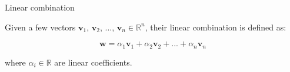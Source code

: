 \documentclass{beamer}
\begin{document}
\begin{frame}{Linear combination}
	\begin{flushleft}
		
	Given a few vectors $\mathbf v_1$, $\mathbf v_2$, ..., $\mathbf v_n \in \mathbb{R}^n$, their linear combination is defined as:
	
	\begin{equation}
		\mathbf w = \alpha_1 \mathbf v_1 + \alpha_2 \mathbf v_2 + ... + \alpha_n \mathbf v_n
	\end{equation}
	
	where $\alpha_i \in \mathbb{R}$ are linear coefficients.
	
	\end{flushleft}
\end{frame}
\end{document}
